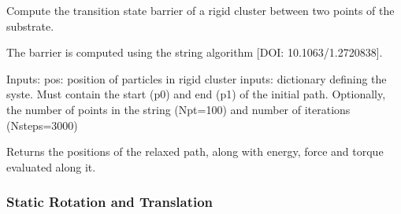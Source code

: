 \documentclass[letterpaper,10pt,english]{sphinxmanual}
\begin{document}
\begin{fulllineitems}
\label{\detokenize{static_barrier_string:static_barrier_string.static_barrier}}
\pysigstartsignatures
{}
\pysigstopsignatures
\sphinxAtStartPar
Compute the transition state barrier of a rigid cluster between two points of the substrate.

\sphinxAtStartPar
The barrier is computed using the string algorithm {[}DOI: 10.1063/1.2720838{]}.

\sphinxAtStartPar
Inputs:
\sphinxhyphen{} pos: position of particles in rigid cluster
\sphinxhyphen{} inputs: dictionary defining the syste. Must contain the start (p0) and end (p1) of the initial path. Optionally, the number of points in the string (Npt=100) and number of iterations (Nsteps=3000)

\sphinxAtStartPar
Returns the positions of the relaxed path, along with energy, force and torque evaluated along it.

\end{fulllineitems}


\sphinxstepscope


\subsubsection{Static Rotation and Translation}
\label{\detokenize{static_rototrasl_map:module-static_rototrasl_map}}\label{\detokenize{static_rototrasl_map:static-rotation-and-translation}}\label{\detokenize{static_rototrasl_map::doc}}
\end{document}
